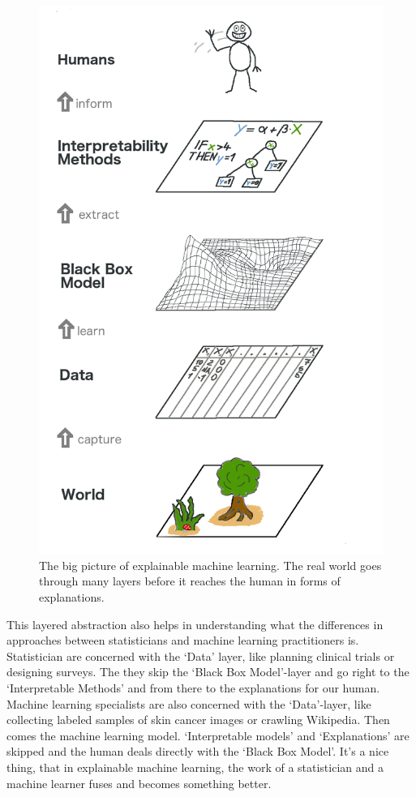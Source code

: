 \documentclass[12pt,]{krantz}
\theoremstyle{definition}
\theoremstyle{definition}
\theoremstyle{definition}
\theoremstyle{remark}
\begin{document}
\begin{figure}
\includegraphics[width=0.8\linewidth]{images/big-picture} \caption{The big picture of explainable machine learning. The real world goes through many layers before it reaches the human in forms of explanations.}\label{fig:bigpicture}
\end{figure}

This layered abstraction also helps in understanding what the
differences in approaches between statisticians and machine learning
practitioners is. Statistician are concerned with the `Data' layer, like
planning clinical trials or designing surveys. The they skip the `Black
Box Model'-layer and go right to the `Interpretable Methods' and from
there to the explanations for our human. Machine learning specialists
are also concerned with the `Data'-layer, like collecting labeled
samples of skin cancer images or crawling Wikipedia. Then comes the
machine learning model. `Interpretable models' and `Explanations' are
skipped and the human deals directly with the `Black Box Model'. It's a
nice thing, that in explainable machine learning, the work of a
statistician and a machine learner fuses and becomes something better.
\end{document}
